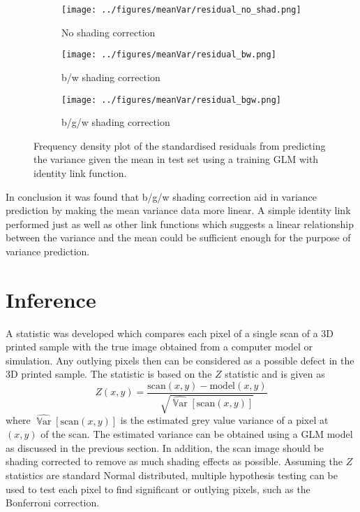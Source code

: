 \documentclass[a4paper]{proc}
\DeclareMathOperator{\variance}{\mathbb{V}ar}
\begin{document}
\begin{figure*}
	\centering
	\begin{subfigure}{0.45\textwidth}
		\centering
		\texttt{[image: ../figures/meanVar/residual\_no\_shad.png]}
		\caption{No shading correction}
	\end{subfigure}
	\begin{subfigure}{0.45\textwidth}
		\centering
		\texttt{[image: ../figures/meanVar/residual\_bw.png]}
		\caption{b/w shading correction}
	\end{subfigure}
	\begin{subfigure}{0.45\textwidth}
		\centering
		\texttt{[image: ../figures/meanVar/residual\_bgw.png]}
		\caption{b/g/w shading correction}
	\end{subfigure}
	\caption{Frequency density plot of the standardised residuals from predicting the variance given the mean in test set using a training GLM with identity link function.}
	\label{fig:glm_residual}
\end{figure*}

In conclusion it was found that b/g/w shading correction aid in variance prediction by making the mean variance data more linear. A simple identity link performed just as well as other link functions which suggests a linear relationship between the variance and the mean could be sufficient enough for the purpose of variance prediction.

\section{Inference}

A statistic was developed which compares each pixel of a single scan of a 3D printed sample with the true image obtained from a computer model or simulation. Any outlying pixels then can be considered as a possible defect in the 3D printed sample. The statistic is based on the $Z$ statistic and is given as
\begin{equation}
Z(x,y) = \frac{\text{scan}(x,y) - \text{model}(x,y)}{\sqrt{\widehat{\variance}[\text{scan}(x,y)]}}
\end{equation}
where $\widehat{\variance}[\text{scan}(x,y)]$ is the estimated grey value variance of a pixel at $(x,y)$ of the scan. The estimated variance can be obtained using a GLM model as discussed in the previous section. In addition, the scan image should be shading corrected to remove as much shading effects as possible. Assuming the $Z$ statistics are standard Normal distributed, multiple hypothesis testing can be used to test each pixel to find significant or outlying pixels, such as the Bonferroni correction.
\end{document}

